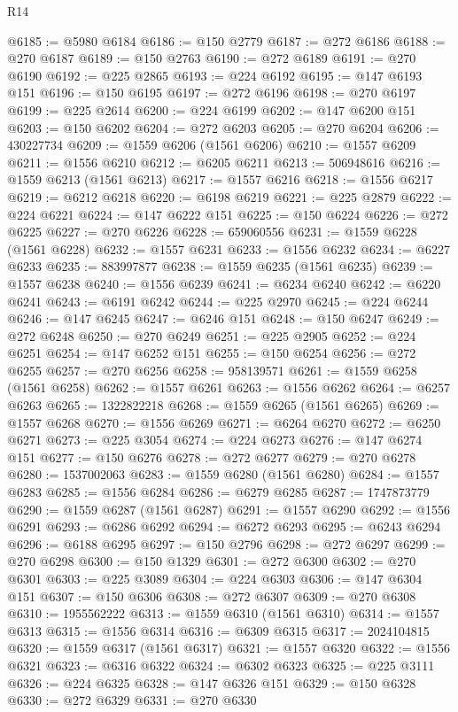 \begin{lexlean}{R14}
\begin{coremodule}
@6185 := @5980 @6184
@6186 := @150 @2779
@6187 := @272 @6186
@6188 := @270 @6187
@6189 := @150 @2763
@6190 := @272 @6189
@6191 := @270 @6190
@6192 := @225 @2865
@6193 := @224 @6192
@6195 := @147 @6193 @151
@6196 := @150 @6195
@6197 := @272 @6196
@6198 := @270 @6197
@6199 := @225 @2614
@6200 := @224 @6199
@6202 := @147 @6200 @151
@6203 := @150 @6202
@6204 := @272 @6203
@6205 := @270 @6204
@6206 := 430227734
@6209 := @1559 @6206 (@1561 @6206)
@6210 := @1557 @6209
@6211 := @1556 @6210
@6212 := @6205 @6211
@6213 := 506948616
@6216 := @1559 @6213 (@1561 @6213)
@6217 := @1557 @6216
@6218 := @1556 @6217
@6219 := @6212 @6218
@6220 := @6198 @6219
@6221 := @225 @2879
@6222 := @224 @6221
@6224 := @147 @6222 @151
@6225 := @150 @6224
@6226 := @272 @6225
@6227 := @270 @6226
@6228 := 659060556
@6231 := @1559 @6228 (@1561 @6228)
@6232 := @1557 @6231
@6233 := @1556 @6232
@6234 := @6227 @6233
@6235 := 883997877
@6238 := @1559 @6235 (@1561 @6235)
@6239 := @1557 @6238
@6240 := @1556 @6239
@6241 := @6234 @6240
@6242 := @6220 @6241
@6243 := @6191 @6242
@6244 := @225 @2970
@6245 := @224 @6244
@6246 := @147 @6245
@6247 := @6246 @151
@6248 := @150 @6247
@6249 := @272 @6248
@6250 := @270 @6249
@6251 := @225 @2905
@6252 := @224 @6251
@6254 := @147 @6252 @151
@6255 := @150 @6254
@6256 := @272 @6255
@6257 := @270 @6256
@6258 := 958139571
@6261 := @1559 @6258 (@1561 @6258)
@6262 := @1557 @6261
@6263 := @1556 @6262
@6264 := @6257 @6263
@6265 := 1322822218
@6268 := @1559 @6265 (@1561 @6265)
@6269 := @1557 @6268
@6270 := @1556 @6269
@6271 := @6264 @6270
@6272 := @6250 @6271
@6273 := @225 @3054
@6274 := @224 @6273
@6276 := @147 @6274 @151
@6277 := @150 @6276
@6278 := @272 @6277
@6279 := @270 @6278
@6280 := 1537002063
@6283 := @1559 @6280 (@1561 @6280)
@6284 := @1557 @6283
@6285 := @1556 @6284
@6286 := @6279 @6285
@6287 := 1747873779
@6290 := @1559 @6287 (@1561 @6287)
@6291 := @1557 @6290
@6292 := @1556 @6291
@6293 := @6286 @6292
@6294 := @6272 @6293
@6295 := @6243 @6294
@6296 := @6188 @6295
@6297 := @150 @2796
@6298 := @272 @6297
@6299 := @270 @6298
@6300 := @150 @1329
@6301 := @272 @6300
@6302 := @270 @6301
@6303 := @225 @3089
@6304 := @224 @6303
@6306 := @147 @6304 @151
@6307 := @150 @6306
@6308 := @272 @6307
@6309 := @270 @6308
@6310 := 1955562222
@6313 := @1559 @6310 (@1561 @6310)
@6314 := @1557 @6313
@6315 := @1556 @6314
@6316 := @6309 @6315
@6317 := 2024104815
@6320 := @1559 @6317 (@1561 @6317)
@6321 := @1557 @6320
@6322 := @1556 @6321
@6323 := @6316 @6322
@6324 := @6302 @6323
@6325 := @225 @3111
@6326 := @224 @6325
@6328 := @147 @6326 @151
@6329 := @150 @6328
@6330 := @272 @6329
@6331 := @270 @6330

\end{coremodule}
\end{lexlean}
